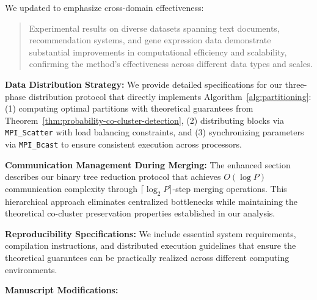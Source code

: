 \documentclass{ar2rc}
\begin{document}
We updated  to emphasize cross-domain effectiveness:

\begin{quote}
  Experimental results on diverse datasets spanning text documents, recommendation systems, and gene expression data demonstrate substantial improvements in computational efficiency and scalability, confirming the method's effectiveness across different data types and scales.
\end{quote}



\textbf{Data Distribution Strategy:}
We provide detailed specifications for our three-phase distribution protocol that directly implements Algorithm~\ref{alg:partitioning}: (1) computing optimal partitions with theoretical guarantees from Theorem~\ref{thm:probability-co-cluster-detection}, (2) distributing blocks via \texttt{MPI\_Scatter} with load balancing constraints, and (3) synchronizing parameters via \texttt{MPI\_Bcast} to ensure consistent execution across processors.

\textbf{Communication Management During Merging:}
The enhanced section describes our binary tree reduction protocol that achieves $O(\log P)$ communication complexity through $\lceil \log_2 P \rceil$-step merging operations. This hierarchical approach eliminates centralized bottlenecks while maintaining the theoretical co-cluster preservation properties established in our analysis.

\textbf{Reproducibility Specifications:}
We include essential system requirements, compilation instructions, and distributed execution guidelines that ensure the theoretical guarantees can be practically realized across different computing environments.

\textbf{Manuscript Modifications:}
\end{document}
